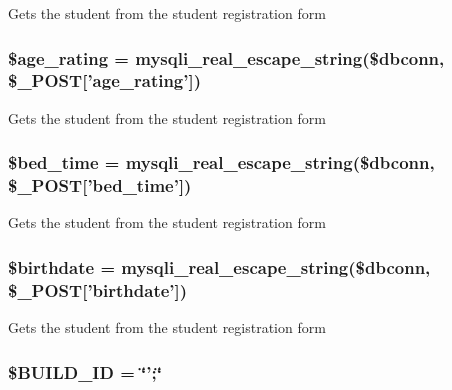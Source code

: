 \-Gets the student from the student registration form \hypertarget{admin__view_2validate_2studentVal_8php_a69122fb82424ff3bb0780b56f8bc8e6d}{
\subsubsection[{\$age\-\_\-rating}]{\setlength{\rightskip}{0pt plus 5cm}\$age\-\_\-rating = mysqli\-\_\-real\-\_\-escape\-\_\-string(\$dbconn, \$\-\_\-\-P\-O\-S\-T\mbox{[}'age\-\_\-rating'\mbox{]})}}\label{admin__view_2validate_2studentVal_8php_a69122fb82424ff3bb0780b56f8bc8e6d}
\-Gets the student from the student registration form \hypertarget{admin__view_2validate_2studentVal_8php_a08edd61848021bc8ed4c15804842d5fb}{
\subsubsection[{\$bed\-\_\-time}]{\setlength{\rightskip}{0pt plus 5cm}\$bed\-\_\-time = mysqli\-\_\-real\-\_\-escape\-\_\-string(\$dbconn, \$\-\_\-\-P\-O\-S\-T\mbox{[}'bed\-\_\-time'\mbox{]})}}\label{admin__view_2validate_2studentVal_8php_a08edd61848021bc8ed4c15804842d5fb}
\-Gets the student from the student registration form \hypertarget{admin__view_2validate_2studentVal_8php_a1d5a040d6cd65b40daa47911e18adbb0}{
\subsubsection[{\$birthdate}]{\setlength{\rightskip}{0pt plus 5cm}\$birthdate = mysqli\-\_\-real\-\_\-escape\-\_\-string(\$dbconn, \$\-\_\-\-P\-O\-S\-T\mbox{[}'birthdate'\mbox{]})}}\label{admin__view_2validate_2studentVal_8php_a1d5a040d6cd65b40daa47911e18adbb0}
\-Gets the student from the student registration form \hypertarget{admin__view_2validate_2studentVal_8php_a4003cf8da4c94911cef7e69853cbac42}{
\subsubsection[{\$\-B\-U\-I\-L\-D\-\_\-\-I\-D}]{\setlength{\rightskip}{0pt plus 5cm}\$\-B\-U\-I\-L\-D\-\_\-\-I\-D = \char`\"{}';\char`\"{}}}\label{admin__view_2validate_2studentVal_8php_a4003cf8da4c94911cef7e69853cbac42}
